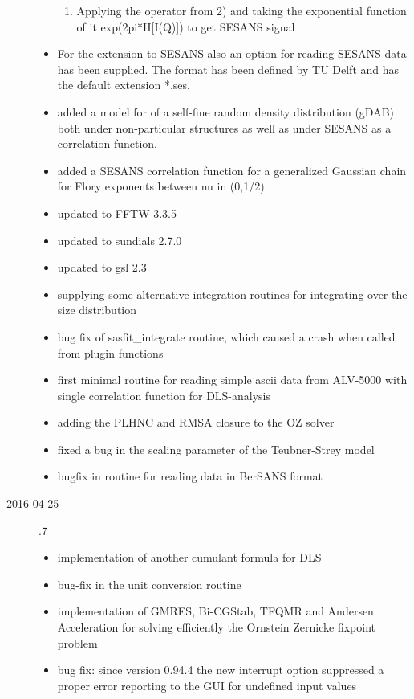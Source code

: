 \begin{description}
\begin{itemize}
\begin{enumerate}
            \item Applying the operator from 2) and taking the exponential function of it exp(2pi*H[I(Q)]) to get SESANS signal
        \end{enumerate}
        \item For the extension to SESANS also an option for reading SESANS data has been supplied. The format has been defined by TU Delft and has the default extension *.ses.
        \item added a model for of a self-fine random density distribution (gDAB) both under non-particular  structures as well as under SESANS as a correlation function.
        \item added a SESANS correlation function for a generalized Gaussian chain for Flory exponents between nu in (0,1/2)
        \item updated to FFTW 3.3.5
        \item updated to sundials 2.7.0
        \item updated to gsl 2.3
        \item supplying some alternative integration routines for integrating over the size distribution
        \item bug fix of sasfit\_integrate routine, which caused a crash when called from plugin functions
        \item first minimal routine for reading simple ascii data from ALV-5000 with single correlation function for DLS-analysis
        \item adding the PLHNC and RMSA closure to the OZ solver
        \item fixed a bug in the scaling parameter of the Teubner-Strey model
        \item bugfix in routine for reading data in BerSANS format
    \end{itemize}
\item[2016-04-25] .7
    \begin{itemize}
        \item  implementation of another cumulant formula for DLS
        \item  bug-fix in the unit conversion routine
        \item  implementation of GMRES, Bi-CGStab, TFQMR and Andersen Acceleration
                for solving efficiently the Ornstein Zernicke fixpoint problem
        \item   bug fix: since version 0.94.4 the new interrupt option suppressed
                a proper error reporting to the GUI for undefined input values

\end{itemize}
\end{description}
